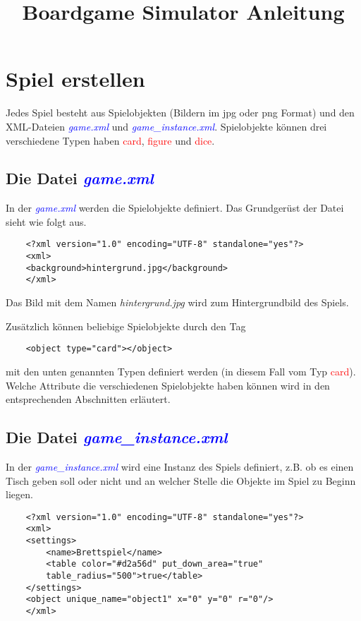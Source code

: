 \documentclass{scrbook}
\title{Boardgame Simulator Anleitung}
\newcommand{\gamefile}[1]{\textit{\textcolor{blue}{#1}}\xspace}
\newcommand{\game}{\gamefile{game.xml}}
\newcommand{\gameinstance}{\gamefile{game\_instance.xml}}
\newcommand{\card}{\textcolor{red}{card}\xspace}
\newcommand{\gamefigure}{\textcolor{red}{figure}\xspace}
\newcommand{\dice}{\textcolor{red}{dice}\xspace}
\begin{document}
	\maketitle
	\tableofcontents
	\chapter{Spiel erstellen}
	Jedes Spiel besteht aus Spielobjekten (Bildern im jpg oder png Format) und den XML-Dateien \game und \gameinstance. Spielobjekte können drei verschiedene Typen haben \card, \gamefigure und \dice.
	\section{Die Datei \game}
	In der \game werden die Spielobjekte definiert. Das Grundgerüst der Datei sieht wie folgt aus. 
	
	\lstset{language=XML}
	\begin{lstlisting}
	<?xml version="1.0" encoding="UTF-8" standalone="yes"?>
	<xml>
	<background>hintergrund.jpg</background>
	</xml>
	\end{lstlisting}
	
	Das Bild mit dem Namen \textit{hintergrund.jpg} wird zum Hintergrundbild des Spiels.

	Zusätzlich können beliebige Spielobjekte durch den Tag \lstset{language=XML}
	\begin{lstlisting}
	<object type="card"></object>
	\end{lstlisting}  mit den unten genannten Typen definiert werden (in diesem Fall vom Typ \card). Welche Attribute die verschiedenen Spielobjekte haben können wird in den entsprechenden Abschnitten erläutert.

	\section{Die Datei \gameinstance}
	In der \gameinstance wird eine Instanz des Spiels definiert, z.B. ob es einen Tisch geben soll oder nicht und an welcher Stelle die Objekte im Spiel zu Beginn liegen.
	
	\lstset{language=XML}
	\begin{lstlisting}	
	<?xml version="1.0" encoding="UTF-8" standalone="yes"?>
	<xml>
	<settings>
		<name>Brettspiel</name>
		<table color="#d2a56d" put_down_area="true"
		table_radius="500">true</table>
	</settings>
	<object unique_name="object1" x="0" y="0" r="0"/>
	</xml>
	\end{lstlisting}
	
\end{document}

